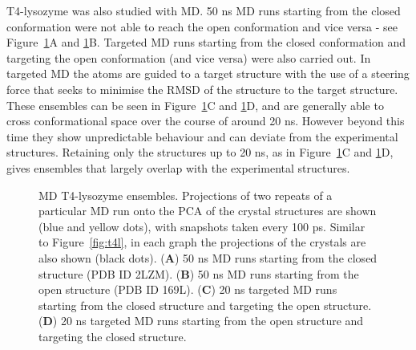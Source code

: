 T4-lysozyme was also studied with MD.
50 ns MD runs starting from the closed conformation were not able to reach the open conformation and vice versa - see Figure~\ref{fig:t4l_md}A and \ref{fig:t4l_md}B.
Targeted MD runs starting from the closed conformation and targeting the open conformation (and vice versa) were also carried out.
In targeted MD the atoms are guided to a target structure with the use of a steering force that seeks to minimise the RMSD of the structure to the target structure.
These ensembles can be seen in Figure~\ref{fig:t4l_md}C and \ref{fig:t4l_md}D, and are generally able to cross conformational space over the course of around 20 ns.
However beyond this time they show unpredictable behaviour and can deviate from the experimental structures.
Retaining only the structures up to 20 ns, as in Figure~\ref{fig:t4l_md}C and \ref{fig:t4l_md}D, gives ensembles that largely overlap with the experimental structures.


\begin{figure}
\centering


\caption{MD T4-lysozyme ensembles.
Projections of two repeats of a particular MD run onto the PCA of the crystal structures are shown (blue and yellow dots), with snapshots taken every 100 ps.
Similar to Figure~\ref{fig:t4l}, in each graph the projections of the crystals are also shown (black dots).
(\textbf{A}) 50 ns MD runs starting from the closed structure (PDB ID 2LZM).
(\textbf{B}) 50 ns MD runs starting from the open structure (PDB ID 169L).
(\textbf{C}) 20 ns targeted MD runs starting from the closed structure and targeting the open structure.
(\textbf{D}) 20 ns targeted MD runs starting from the open structure and targeting the closed structure.}

\label{fig:t4l_md}
\end{figure}


